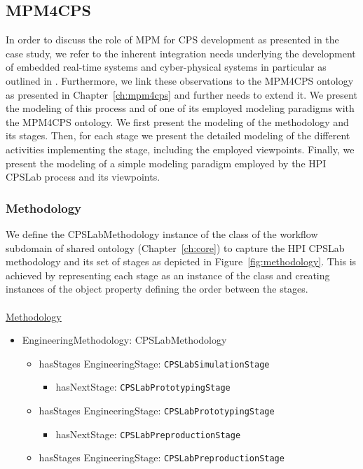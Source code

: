 \subsection{MPM4CPS}\label{subsec:cpslab-mpm4cps}
%
In order to discuss the role of MPM for CPS development as presented in the case study, we refer to the inherent integration needs underlying the development of embedded real-time systems and cyber-physical systems in particular as outlined in \cite{GieseNNS2011}. Furthermore, we link these observations to the MPM4CPS ontology as presented in Chapter~\ref{ch:mpm4cps} and further needs to extend it.
We present the modeling of this process and of one of its employed modeling paradigms with the MPM4CPS ontology. We first present the modeling of the methodology and its stages. Then, for each stage we present the detailed modeling of the different activities implementing the stage, including the employed viewpoints. Finally, we present the modeling of a simple modeling paradigm employed by the HPI CPSLab process and its viewpoints.
\subsubsection{Methodology}

We define the CPSLabMethodology instance of the  class of the workflow subdomain of shared ontology (Chapter~\ref{ch:core}) to capture the HPI CPSLab methodology and its set of stages as depicted in Figure~\ref{fig:methodology}. This is achieved by representing each stage as an instance of the  class and creating instances of the  object property defining the order between the stages.
\\
\\
\noindent\uline{Methodology}
\begin{itemize}
\item EngineeringMethodology: CPSLabMethodology
\begin{itemize}
    \item hasStages EngineeringStage: \texttt{CPSLabSimulationStage}
    \begin{itemize}
        \item hasNextStage: \texttt{CPSLabPrototypingStage}
    \end{itemize}
    \item hasStages EngineeringStage: \texttt{CPSLabPrototypingStage}
    \begin{itemize}
        \item hasNextStage: \texttt{CPSLabPreproductionStage}
    \end{itemize}
    \item hasStages EngineeringStage: \texttt{CPSLabPreproductionStage}
\end{itemize}
\end{itemize}

